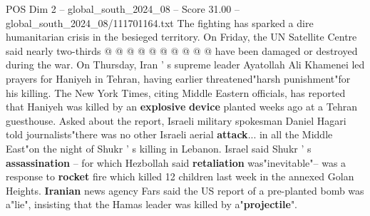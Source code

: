 \begin{textsample}{POS Dim 2 – global\_south\_2024\_08 – Score 31.00 – global\_south\_2024\_08/111701164.txt}
The fighting has sparked a dire humanitarian crisis in the besieged territory.
On Friday, the UN Satellite Centre said nearly two-thirds @ @ @ @ @ @ @ @ @ @ have been damaged or destroyed during the war.
On Thursday, Iran ' s supreme leader Ayatollah Ali Khamenei led prayers for Haniyeh in Tehran, having earlier threatened"harsh punishment"for his killing.
The New York Times, citing Middle Eastern officials, has reported that Haniyeh was killed by an \textbf{explosive} \textbf{device} planted weeks ago at a Tehran guesthouse.
Asked about the report, Israeli military spokesman Daniel Hagari told journalists"there was no other Israeli aerial \textbf{attack}... in all the Middle East"on the night of Shukr ' s killing in Lebanon.
Israel said Shukr ' s \textbf{assassination} -- for which Hezbollah said \textbf{retaliation} was"inevitable"-- was a response to \textbf{rocket} fire which killed 12 children last week in the annexed Golan Heights. \textbf{Iranian} news agency Fars said the US report of a pre-planted bomb was a"lie", insisting that the Hamas leader was killed by a"\textbf{projectile}".

\end{textsample}
